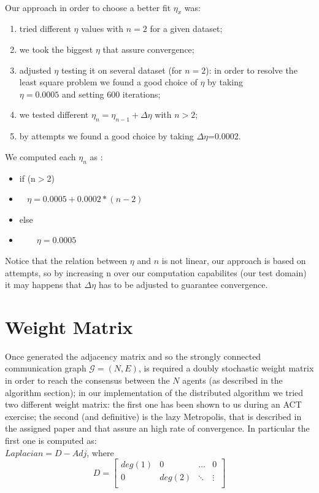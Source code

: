 \documentclass[a4paper,11pt,oneside]{book}
\begin{document}
{{\\Our approach in order to choose a better fit $\eta_{x}$ was:
\begin{enumerate}
\item tried different $\eta$ values with $n=2$ for a given dataset;
\item we took the biggest $\eta$ that assure convergence;
\item adjusted $\eta$ testing it on several dataset (for $n=2$): in order to resolve the least square problem we found a good choice of $\eta$ by taking \\$\eta=0.0005$ and setting 600 iterations;
\item we tested different $\eta_{n}=\eta_{n-1}+\Delta\eta$ with $n>2$;
\item by attempts we found  a good choice by taking  $\Delta\eta$=0.0002.
\end{enumerate}
We computed each $\eta_{n}$ as :
\begin{itemize}
\item if (n$>$2)
\item $~~~~\eta=0.0005+0.0002*(n-2)$
\item else
\item~~~~$\eta=0.0005$
\end{itemize}
Notice that the relation between $\eta$ and $n$ is not linear,  our approach is based on attempts, so by increasing n over our computation capabilites (our test domain) it may happens that $\Delta\eta$ has to be adjusted to guarantee convergence.


\section{Weight Matrix}
Once generated the adjacency matrix and so the strongly connected communication graph $\mathcal{G}= (N,E)$, is required  a doubly stochastic weight matrix in order to reach the consensus between the $N$ agents (as described in the algorithm section); in our implementation of the distributed algorithm we tried two different weight matrix: the first one has been shown to us during an ACT exercise; the second (and definitive) is the lazy Metropolis, that is described in the assigned paper and that assure an high rate of convergence.
In particular the first one is computed as: 
\\$Laplacian = D - Adj$, where
\[
D = \begin{bmatrix} 
    deg(1) & 0 & \dots & 0\\
    0 & deg(2) & \ddots & \vdots \\


\end{bmatrix}\]}}
\end{document}
